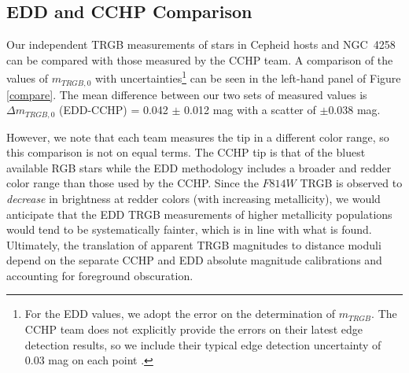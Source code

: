 \documentclass[twocolumn]{aastex62}
\begin{document}
\subsection{EDD and CCHP Comparison}

Our independent TRGB measurements of stars in Cepheid hosts and NGC~4258 can be compared with those measured by the CCHP team. A comparison of the values of $m_{TRGB,0}$ with uncertainties\footnote{For the EDD values, we adopt the error on the determination of $m_{TRGB}$. The CCHP team does not explicitly provide the errors on their latest edge detection results, so we include their typical edge detection uncertainty of 0.03 mag on each point \citep{2019ApJ...882...34F}.} can be seen in the left-hand panel of Figure \ref{compare}. The mean difference between our two sets of measured values is $\Delta m_{TRGB,0}$ (EDD-CCHP) = 0.042 $\pm$ 0.012 mag with a scatter of $\pm0.038$ mag. 

\begin{figure*}
\caption{\textbf{Left)} A comparison between the measured value of the TRGB $m_{TRGB,0}$ by CCHP and ourselves (EDD). Overall, the EDD catalog reports values that are 0.042 mag fainter (dashed-blue line), averaged by host, than those found by the CCHP. EDD values typically probe further red in color than CCHP. Since the $F814W$ magnitude of the TRGB is known to decrease slightly with redder color, this small offset is expected. \textbf{Right)} A comparison of the CCHP and EDD catalog TRGB distance scales relative to the maser host NGC~4258 distance.  Overall we find good agreement between our two distance scales, bolstering confidence in the ability of the TRGB to provide high-quality, reproducible distance measurements. The dashed-blue line in the bottom panel shows the mean offset ($-$0.028 mag) weighted by galaxy between our two \textit{relative} distance measures (subtracting each group's value of $\mu_{TRGB}$ for NGC~4258), with a scatter of $\pm$0.052 mag.}
\label{compare}
\end{figure*}
However, we note that each team measures the tip in a different color range, so this comparison is not on equal terms. The CCHP tip is that of the bluest available RGB stars while the EDD methodology includes a broader and redder color range than those used by the CCHP. Since the $F814W$ TRGB is observed to \textit{decrease} in brightness at redder colors (with increasing metallicity), we would anticipate that the EDD TRGB measurements of higher metallicity populations would tend to be systematically fainter, which is in line with what is found. Ultimately, the translation of apparent TRGB magnitudes to distance moduli depend on the separate CCHP and EDD absolute magnitude calibrations and accounting for foreground obscuration. 
\end{document}

